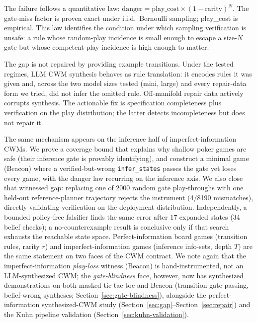 \documentclass[11pt]{article}
\theoremstyle{remark}
\begin{document}
The failure follows a quantitative law: $\mathrm{danger} = \mathrm{play\_cost} \times (1 - \mathrm{rarity})^N$. The gate-miss factor is proven exact under i.i.d.\ Bernoulli sampling; play\_cost is empirical. This law identifies the condition under which sampling verification is unsafe: a rule whose random-play incidence is small enough to escape a size-$N$ gate but whose competent-play incidence is high enough to matter.

The gap is not repaired by providing example transitions. Under the tested regimes, LLM CWM synthesis behaves as rule translation: it encodes rules it was given and, across the two model sizes tested (mini, large) and every repair-data form we tried, did not infer the omitted rule. Off-manifold repair data actively corrupts synthesis. The actionable fix is specification completeness plus verification on the play distribution; the latter detects incompleteness but does not repair it.

The same mechanism appears on the inference half of imperfect-information CWMs. We prove a coverage bound that explains why shallow poker games are safe (their inference gate is provably identifying), and construct a minimal game (Beacon) where a verified-but-wrong \texttt{infer\_states} passes the gate yet loses every game, with the danger law recurring on the inference axis. We also close that witnessed gap: replacing one of 2000 random gate play-throughs with one held-out reference-planner trajectory rejects the instrument (4/8190 mismatches), directly validating verification on the deployment distribution. Independently, a bounded policy-free falsifier finds the same error after 17 expanded states (34 belief checks); a no-counterexample result is conclusive only if that search exhausts the reachable state space. Perfect-information board games (transition rules, rarity $r$) and imperfect-information games (inference info-sets, depth $T$) are the same statement on two faces of the CWM contract. We note again that the imperfect-information \emph{play-loss} witness (Beacon) is hand-instrumented, not an LLM-synthesized CWM; the \emph{gate-blindness} face, however, now has synthesized demonstrations on both masked tic-tac-toe and Beacon (transition-gate-passing, belief-wrong syntheses; Section~\ref{sec:gate-blindness}), alongside the perfect-information synthesized-CWM study (Section~\ref{sec:gap}--Section~\ref{sec:repair}) and the Kuhn pipeline validation (Section~\ref{sec:kuhn-validation}).
\end{document}
